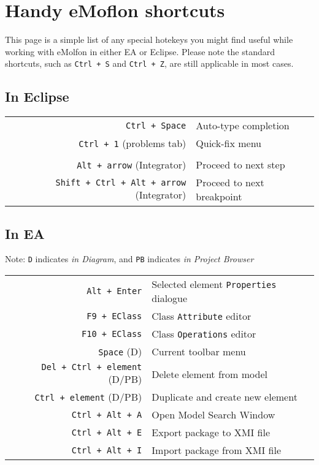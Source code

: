 \newpage
\section{Handy eMoflon shortcuts}
\genHeader

This page is a simple list of any special hotekeys you might find useful while working with eMolfon in either EA or Eclipse. Please note the standard
shortcuts, such as \texttt{Ctrl + S} and \texttt{Ctrl + Z}, are still applicable in most cases.

\vspace{1cm}

\subsection{In Eclipse}

\begin{tabular}{r|l}
\texttt{Ctrl + Space} & Auto-type completion\\
\texttt{Ctrl + 1} (problems tab) & Quick-fix menu \\
\\
\texttt{Alt + arrow} (Integrator) & Proceed to next step \\
\texttt{Shift + Ctrl + Alt + arrow} (Integrator) & Proceed to next breakpoint \\
%
\end{tabular}

\vspace{1cm}

\subsection{In EA}

{\small Note: \texttt{D} indicates \emph{in Diagram}, and \texttt{PB} indicates \emph{in Project Browser}}

\begin{tabular}{r|l}
\texttt{Alt + Enter} & Selected element \texttt{Properties} dialogue \\
\texttt{F9 + EClass} & Class \texttt{Attribute} editor \\
\texttt{F10 + EClass} & Class \texttt{Operations} editor \\
\texttt{Space} (D) & Current toolbar menu \\
\texttt{Del + Ctrl + element} (D/PB) & Delete element from model\\
\texttt{Ctrl + element} (D/PB) & Duplicate and create new element \\
\texttt{Ctrl + Alt + A} & Open Model Search Window \\
\texttt{Ctrl + Alt + E} & Export package to XMI file \\
\texttt{Ctrl + Alt + I} & Import package from XMI file \\
%
\end{tabular}
